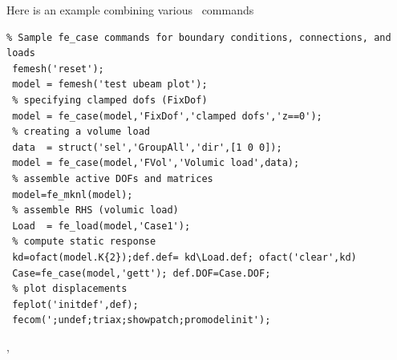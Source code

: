 

Here is an example combining various \fecase\ commands

\begin{verbatim}
% Sample fe_case commands for boundary conditions, connections, and loads
 femesh('reset');
 model = femesh('test ubeam plot');
 % specifying clamped dofs (FixDof) 
 model = fe_case(model,'FixDof','clamped dofs','z==0');
 % creating a volume load
 data  = struct('sel','GroupAll','dir',[1 0 0]);
 model = fe_case(model,'FVol','Volumic load',data);
 % assemble active DOFs and matrices
 model=fe_mknl(model);
 % assemble RHS (volumic load)
 Load  = fe_load(model,'Case1');
 % compute static response
 kd=ofact(model.K{2});def.def= kd\Load.def; ofact('clear',kd)
 Case=fe_case(model,'gett'); def.DOF=Case.DOF;
 % plot displacements
 feplot('initdef',def);
 fecom(';undef;triax;showpatch;promodelinit');
\end{verbatim}%


\noindent \femk, \fecase







